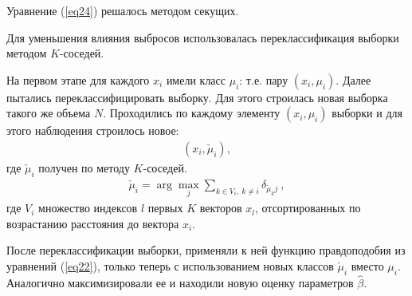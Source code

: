 Уравнение (\ref{eq24}) решалось методом секущих.

Для уменьшения влияния выбросов использовалась переклассификация выборки методом $K$-соседей.

На первом этапе для каждого $x_i$ имели класс $\mu_i$: т.е. пару $(x_i,\mu_i)$.
Далее пытались переклассифицировать выборку. 
Для этого строилась новая выборка такого же объема $N$.
Проходились по каждому элементу $(x_i, \mu_i)$ выборки и для этого наблюдения строилось новое:
\begin{eqnarray}
    (x_i, \check{\mu}_i),
\end{eqnarray}
где $\check{\mu}_i$ получен по методу $K$-соседей.\hfill\break
\begin{eqnarray}
    \check{\mu}_i = \arg\max_j \sum_{k \in V_i,~k\neq i} \delta_{\check{\mu}_k j}~,
\end{eqnarray}
где $V_i$ множество индексов $l$ первых $K$ векторов $x_l$, отсортированных по возрастанию расстояния до вектора $x_i$.

После переклассификации выборки, применяли к ней функцию правдоподобия из уравнений (\ref{eq22}), только теперь с использованием новых классов $\check{\mu}_i$ вместо $\mu_i$. 
Аналогично максимизировали ее и находили новую оценку параметров $\hat{\beta}$.